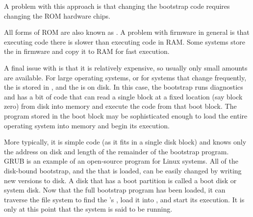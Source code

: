 A problem with this approach is that changing the bootstrap code requires changing the ROM hardware chips.

All forms of ROM are also known as .
A problem with firmware in general is that executing code there is slower than executing code in RAM.\@
Some systems store the  in firmware and copy it to RAM for fast execution.

A final issue with  is that it is relatively expensive, so usually only small amounts are available.
For large operating systems, or for systems that change frequently, the  is stored in , and the  is on disk.
In this case, the bootstrap runs diagnostics and has a bit of code that can read a single block at a fixed location (say block zero) from disk into memory and execute the code from that boot block.
The program stored in the boot block may be sophisticated enough to load the entire operating system into memory and begin its execution.

More typically, it is simple code (as it fits in a single disk block) and knows only the address on disk and length of the remainder of the bootstrap program.
GRUB is an example of an open-source  program for Linux systems.
All of the disk-bound bootstrap, and the  that is loaded, can be easily changed by writing new versions to disk.
A disk that has a boot partition is called a boot disk or system disk.
Now that the full bootstrap program has been loaded, it can traverse the file system to find the 's , load it into , and start its execution.
It is only at this point that the system is said to be running.

